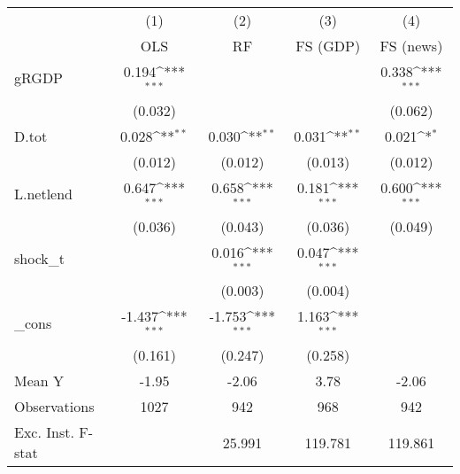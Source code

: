 {
\def\sym#1{\ifmmode^{#1}\else\(^{#1}\)\fi}
\begin{tabular}{l*{4}{c}}
\toprule
            &\multicolumn{1}{c}{(1)}&\multicolumn{1}{c}{(2)}&\multicolumn{1}{c}{(3)}&\multicolumn{1}{c}{(4)}\\
            &\multicolumn{1}{c}{OLS}&\multicolumn{1}{c}{RF}&\multicolumn{1}{c}{FS (GDP)}&\multicolumn{1}{c}{FS (news)}\\
\midrule
gRGDP       &       0.194\sym{***}&                     &                     &       0.338\sym{***}\\
            &     (0.032)         &                     &                     &     (0.062)         \\
\addlinespace
D.tot       &       0.028\sym{**} &       0.030\sym{**} &       0.031\sym{**} &       0.021\sym{*}  \\
            &     (0.012)         &     (0.012)         &     (0.013)         &     (0.012)         \\
\addlinespace
L.netlend   &       0.647\sym{***}&       0.658\sym{***}&       0.181\sym{***}&       0.600\sym{***}\\
            &     (0.036)         &     (0.043)         &     (0.036)         &     (0.049)         \\
\addlinespace
shock\_t     &                     &       0.016\sym{***}&       0.047\sym{***}&                     \\
            &                     &     (0.003)         &     (0.004)         &                     \\
\addlinespace
\_cons      &      -1.437\sym{***}&      -1.753\sym{***}&       1.163\sym{***}&                     \\
            &     (0.161)         &     (0.247)         &     (0.258)         &                     \\
\midrule
Mean Y      &       -1.95         &       -2.06         &        3.78         &       -2.06         \\
Observations&        1027         &         942         &         968         &         942         \\
Exc. Inst. F-stat&                     &      25.991         &     119.781         &     119.861         \\
\bottomrule
\end{tabular}
}
